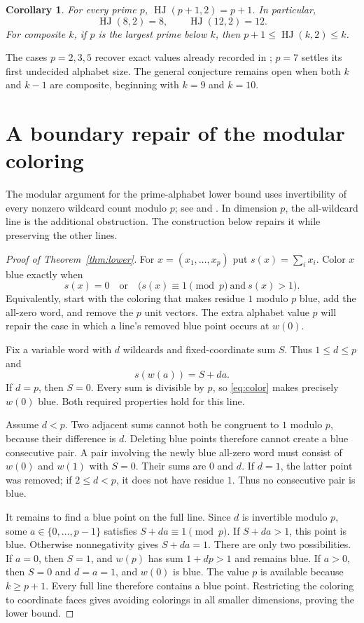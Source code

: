 \documentclass[11pt]{amsart}
\newtheorem{corollary}[theorem]{Corollary}
\newcommand{\HJ}{\operatorname{HJ}}
\begin{document}
\begin{corollary}\label{cor:exact}
For every prime $p$, $\HJ(p+1,2)=p+1$. In particular,
\[
\HJ(8,2)=8,\qquad \HJ(12,2)=12.
\]
For composite $k$, if $p$ is the largest prime below $k$, then
$p+1\le\HJ(k,2)\le k$.
\end{corollary}

The cases $p=2,3,5$ recover exact values already recorded in \cite[Table 3]{CFR}; $p=7$ settles its first undecided alphabet size. The general conjecture remains open when both $k$ and $k-1$ are composite, beginning with $k=9$ and $k=10$.

\section{A boundary repair of the modular coloring}

The modular argument for the prime-alphabet lower bound uses invertibility of every nonzero wildcard count modulo $p$; see \cite[Theorem 15]{CFR} and \cite{Farnsworth}. In dimension $p$, the all-wildcard line is the additional obstruction. The construction below repairs it while preserving the other lines.

\begin{proof}[Proof of Theorem~\ref{thm:lower}]
For $x=(x_1,\ldots,x_p)$ put $s(x)=\sum_i x_i$. Color $x$ blue exactly when
\begin{equation}\label{eq:color}
s(x)=0\quad\text{or}\quad\bigl(s(x)\equiv1\pmod p\ \text{and}\ s(x)>1\bigr).
\end{equation}
Equivalently, start with the coloring that makes residue $1$ modulo $p$ blue, add the all-zero word, and remove the $p$ unit vectors. The extra alphabet value $p$ will repair the case in which a line's removed blue point occurs at $w(0)$.

Fix a variable word with $d$ wildcards and fixed-coordinate sum $S$. Thus $1\le d\le p$ and
\[
s(w(a))=S+da.
\]
If $d=p$, then $S=0$. Every sum is divisible by $p$, so \eqref{eq:color} makes precisely $w(0)$ blue. Both required properties hold for this line.

Assume $d<p$. Two adjacent sums cannot both be congruent to $1$ modulo $p$, because their difference is $d$. Deleting blue points therefore cannot create a blue consecutive pair. A pair involving the newly blue all-zero word must consist of $w(0)$ and $w(1)$ with $S=0$. Their sums are $0$ and $d$. If $d=1$, the latter point was removed; if $2\le d<p$, it does not have residue $1$. Thus no consecutive pair is blue.

It remains to find a blue point on the full line. Since $d$ is invertible modulo $p$, some $a\in\{0,\ldots,p-1\}$ satisfies $S+da\equiv1\pmod p$. If $S+da>1$, this point is blue. Otherwise nonnegativity gives $S+da=1$. There are only two possibilities. If $a=0$, then $S=1$, and $w(p)$ has sum $1+dp>1$ and remains blue. If $a>0$, then $S=0$ and $d=a=1$, and $w(0)$ is blue. The value $p$ is available because $k\ge p+1$. Every full line therefore contains a blue point. Restricting the coloring to coordinate faces gives avoiding colorings in all smaller dimensions, proving the lower bound.
\end{proof}
\end{document}
